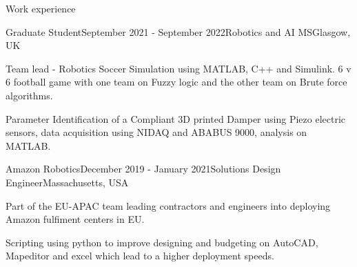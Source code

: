\documentclass{resume} %
\begin{document}
\begin{rSection}{Work experience}
    \begin{rSubsection}{Graduate Student}{September 2021 - September 2022}{Robotics and AI MS}{Glasgow, UK}
        
        \item Team lead - Robotics Soccer Simulation using MATLAB, C++ and Simulink. 6 v 6 football game with one team on Fuzzy logic and the other team on Brute force algorithms. 

        \item Parameter Identification of a Compliant 3D printed Damper using Piezo electric sensors, data acquisition using NIDAQ and ABABUS 9000, analysis on MATLAB.
    \end{rSubsection}

   

    
    \begin{rSubsection}{Amazon Robotics}{December 2019 - January 2021}{Solutions Design Engineer}{Massachusetts, USA}
        \item Part of the EU-APAC team leading contractors and engineers into deploying Amazon fulfiment centers in EU. 
\item Scripting using python to improve designing and budgeting on AutoCAD, Mapeditor and excel which lead to a higher deployment speeds. 
    \end{rSubsection}
    

\end{rSection}
\end{document}

